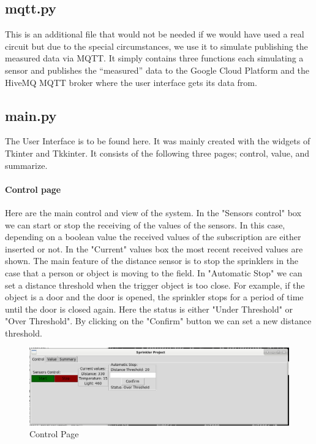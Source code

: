 \documentclass{article}
\begin{document}
\subsection{mqtt.py}
This is an additional file that would not be needed if we would have used a real circuit but due to the special circumstances, we use it to simulate publishing the measured data via MQTT. It simply contains three functions each simulating a sensor and publishes the \enquote{measured} data to the Google Cloud Platform and the HiveMQ MQTT broker where the user interface gets its data from.
\subsection{main.py}
The User Interface is to be found here. It was mainly created with the widgets of Tkinter and Tkkinter. It consists of the following three pages; control, value, and summarize.
\paragraph{Control page}
Here are the main control and view of the system. In the "Sensors control" box we can start or stop the receiving of the values of the sensors. In this case, depending on a boolean value the received values of the subscription are either inserted or not. In the "Current" values box the most recent received values are shown. The main feature of the distance sensor is to stop the sprinklers in the case that a person or object is moving to the field. In "Automatic Stop" we can set a distance threshold when the trigger object is too close. For example, if the object is a door and the door is opened, the sprinkler stops for a period of time until the door is closed again. Here the status is either "Under Threshold" or "Over Threshold". By clicking on the "Confirm" button we can set a new distance threshold.
\begin{figure}
\centering
\includegraphics[scale=0.3]{control_view.png}
\caption{Control Page}
\label{fig:control}
\end{figure}
\end{document}
